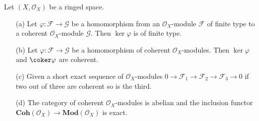 \begin{proposition}\label{sheaf of module coh prop}
Let $(X,\mathscr{O}_X)$ be a ringed space. 
\begin{itemize}
\item[(a)] Let $\varphi:\mathscr{F}\to\mathscr{G}$ be a homomorphism from an $\mathscr{O}_X$-module $\mathscr{F}$ of finite type to a coherent $\mathscr{O}_X$-module $\mathscr{G}$. Then $\ker\varphi$ is of finite type.
\item[(b)] Let $\varphi:\mathscr{F}\to\mathscr{G}$ be a homomorphism of coherent $\mathscr{O}_X$-modules. Then $\ker\varphi$ and $\coker\varphi$ are coherent.
\item[(c)] Given a short exact sequence of $\mathscr{O}_X$-modules $0 \to\mathscr{F}_1\to\mathscr{F}_2 \to\mathscr{F}_3\to 0$ if two out of three are coherent so is the third.
\item[(d)] The category of coherent $\mathscr{O}_X$-modules is abelian and the inclusion functor $\mathbf{Coh}(\mathscr{O}_X)\to\mathbf{Mod}(\mathscr{O}_X)$ is exact.
\end{itemize}
\end{proposition}
